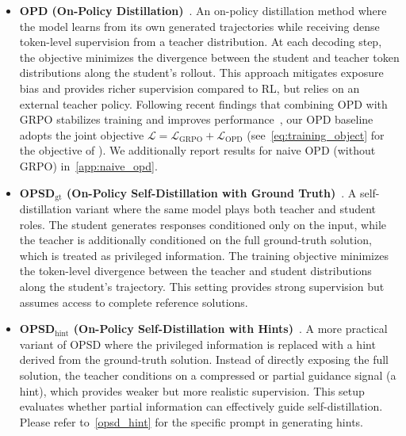 \begin{itemize}
\item \textbf{OPD (On-Policy Distillation)}~\citep{opd}.
An on-policy distillation method where the model learns from its own generated trajectories while receiving dense token-level supervision from a teacher distribution. At each decoding step, the objective minimizes the divergence between the student and teacher token distributions along the student’s rollout. This approach mitigates exposure bias and provides richer supervision compared to RL, but relies on an external teacher policy.
Following recent findings that combining OPD with GRPO stabilizes training and improves performance~\citep{srpo,sdrlvr,bousselham2025vold,wang2026openclaw,opd,skillsd}, our OPD baseline adopts the joint objective $\mathcal{L} = \mathcal{L}_{\mathrm{GRPO}} + \mathcal{L}_{\mathrm{OPD}}$ (see~\cref{eq:training_object} for the objective of \ourmodel). We additionally report results for naive OPD (without GRPO) in~\cref{app:naive_opd}.








\item \textbf{OPSD$_{\mathrm{gt}}$ (On-Policy Self-Distillation with Ground Truth)}~\citep{opsd}.
A self-distillation variant where the same model plays both teacher and student roles. The student generates responses conditioned only on the input, while the teacher is additionally conditioned on the full ground-truth solution, which is treated as privileged information. The training objective minimizes the token-level divergence between the teacher and student distributions along the student’s trajectory. This setting provides strong supervision but assumes access to complete reference solutions.

\item \textbf{OPSD$_{\mathrm{hint}}$ (On-Policy Self-Distillation with Hints)}~\citep{opsd}.
A more practical variant of OPSD where the privileged information is replaced with a hint derived from the ground-truth solution. Instead of directly exposing the full solution, the teacher conditions on a compressed or partial guidance signal (\ie a hint), which provides weaker but more realistic supervision. This setup evaluates whether partial information can effectively guide self-distillation. Please refer to~\cref{opsd_hint} for the specific prompt in generating hints.

\end{itemize}









